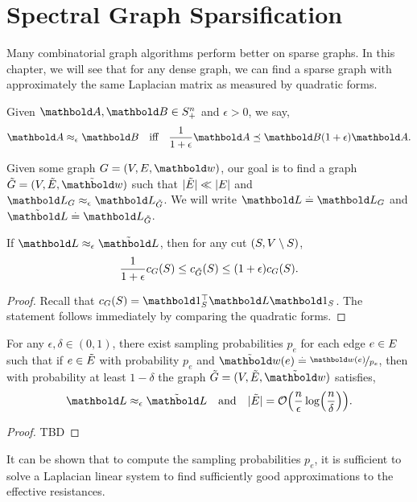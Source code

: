 
\chapter{Spectral Graph Sparsification}

Many combinatorial graph algorithms perform better on sparse graphs. In this chapter, we will see that for any dense graph, we can find a sparse graph with approximately the same Laplacian matrix as measured by quadratic forms.

\begin{defn} Given $\mA, \mB \in \sS_+^n$ and $\epsilon > 0$, we say, \begin{align}
    \mA \approx_\epsilon \mB \quad\text{iff}\quad \frac{1}{1+\epsilon}\mA \preceq \mB (1+\epsilon)\mA.
\end{align}
\end{defn}

Given some graph $G = (\sV,\sE,\vw)$, our goal is to find a graph $\Tilde{G} = (\sV,\Tilde{\sE},\Tilde{\vw})$ such that $|\Tilde{E}| \ll |E|$ and $\mL_G \approx_\epsilon \mL_{\Tilde{G}}$. We will write $\mL \defeq \mL_G$ and $\Tilde{\mL} \defeq \mL_{\Tilde{G}}$.

\begin{lem}
If $\mL \approx_\epsilon \Tilde{\mL}$, then for any cut $(S, V \setminus S)$, \begin{align}
    \frac{1}{1+\epsilon}c_G(S) \leq c_{\Tilde{G}}(S) \leq (1+\epsilon)c_G(S).
\end{align}
\end{lem}
\begin{proof}
Recall that $c_G(\sS) = \trans{\vOne_\sS}\mL\vOne_\sS$. The statement follows immediately by comparing the quadratic forms.
\end{proof}

\begin{thm}
For any $\epsilon, \delta \in (0,1)$, there exist sampling probabilities $p_e$ for each edge $e \in E$ such that if $e \in \Tilde{E}$ with probability $p_e$ and $\Tilde{\vw}(e) \defeq \nicefrac{\vw(e)}{p_e}$, then with probability at least $1-\delta$ the graph $\Tilde{G} = (\sV,\Tilde{\sE},\Tilde{\vw})$ satisfies,\cite{spielman2011graph} \begin{align*}
    \mL \approx_\epsilon \Tilde{\mL} \quad\text{and}\quad |\Tilde{\sE}| = \LandauO{\frac{n}{\epsilon} \log\parentheses*{\frac{n}{\delta}}}.
\end{align*}
\end{thm}
\begin{proof}
TBD
\end{proof}

\begin{rmk}
It can be shown that to compute the sampling probabilities $p_e$, it is sufficient to solve a Laplacian linear system to find sufficiently good approximations to the effective resistances.
\end{rmk}
